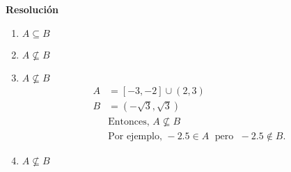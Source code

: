 \documentclass{article}
\begin{document}
\textbf{Resolución}
\begin{enumerate}[label=\roman*)]
    \item $A \subseteq B$
    \item $A \not\subseteq B$
    \item $A \not\subseteq B$
    \begin{align*}
        A &= [-3,-2] \cup (2,3) \\
        B &= (-\sqrt{3}, \sqrt{3}) \\[6pt]
        &\text{Entonces, } A \nsubseteq B \\
        &\text{Por ejemplo, } -2.5 \in A \;\text{ pero }\; -2.5 \notin B.
    \end{align*}
    \item $A \not\subseteq B$
\end{enumerate}
\end{document}
